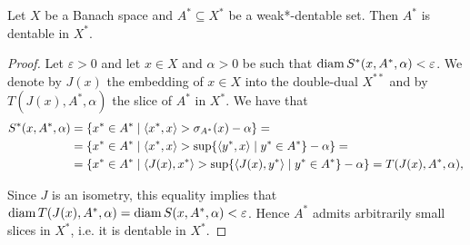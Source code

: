 \begin{proposition}
  \label{thm:analysis:asplund:weak_dentable_sets_are_dentable}
  Let $X$ be a Banach space and $A^* \subseteq X^*$ be a weak*-dentable set. Then $A^*$ is dentable in $X^*$.
\end{proposition}
\begin{proof}
  Let $\varepsilon > 0$ and let $x \in X$ and $\alpha > 0$ be such that $\operatorname{diam} S^*(x, A^*, \alpha) < \varepsilon$.
  We denote by $J(x)$ the embedding of $x \in X$ into the double-dual $X^{**}$ and by $T(J(x), A^*, \alpha)$ the slice of $A^*$ in $X^*$. We have that
  \begin{align*}
    S^*(x, A^*, \alpha)
    &=
    \{ x^* \in A^* \mid \left\langle x^*, x \right\rangle > \sigma_{A^*}(x) - \alpha \}
    = \\ &=
    \{ x^* \in A^* \mid \left\langle x^*, x \right\rangle > \sup \{ \left\langle y^*, x \right\rangle \mid y^* \in A^* \} - \alpha \}
    = \\ &=
    \{ x^* \in A^* \mid \left\langle J(x), x^* \right\rangle > \sup \{ \left\langle J(x), y^* \right\rangle \mid y^* \in A^* \} - \alpha \}
    =
    T(J(x), A^*, \alpha),
  \end{align*}

  Since $J$ is an isometry, this equality implies that $\operatorname{diam} T(J(x), A^*, \alpha) = \operatorname{diam} S(x, A^*, \alpha) < \varepsilon$. Hence $A^*$ admits arbitrarily small slices in $X^*$, i.e. it is dentable in $X^*$.
\end{proof}
